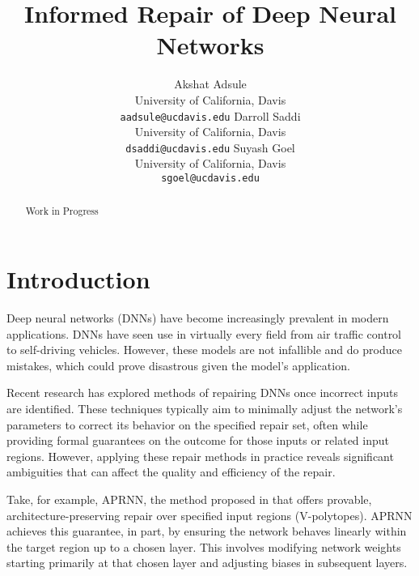 \documentclass{article}
\title{Informed Repair of Deep Neural Networks}
\begin{document}
\author{
    Akshat Adsule \\
    University of California, Davis \\
    \texttt{aadsule@ucdavis.edu}
    \And
    Darroll Saddi \\
    University of California, Davis \\
    \texttt{dsaddi@ucdavis.edu}
    \And
    Suyash Goel \\
    University of California, Davis \\
    \texttt{sgoel@ucdavis.edu}
}

\maketitle

\begin{abstract}
    Work in Progress
\end{abstract}

\section{Introduction}

Deep neural networks (DNNs) have become increasingly prevalent in modern applications.
DNNs have seen use in virtually every field from air traffic control to self-driving vehicles.
However, these models are not infallible and do produce mistakes, which could prove disastrous given the model's application.

Recent research \cite{nawas_provable_2024, sotoudeh_provable_2021, tao_architecture-preserving_2023} has explored methods of repairing DNNs once incorrect inputs are identified.
These techniques typically aim to minimally adjust the network's parameters to correct its behavior on the specified repair set, often while providing formal guarantees on the outcome for those inputs or related input regions.
However, applying these repair methods in practice reveals significant ambiguities that can affect the quality and efficiency of the repair.

Take, for example, APRNN, the method proposed in \cite{tao_architecture-preserving_2023} that offers provable, architecture-preserving repair over specified input regions (V-polytopes).
APRNN achieves this guarantee, in part, by ensuring the network behaves linearly within the target region up to a chosen layer.
This involves modifying network weights starting primarily at that chosen layer and adjusting biases in subsequent layers.
\end{document}
